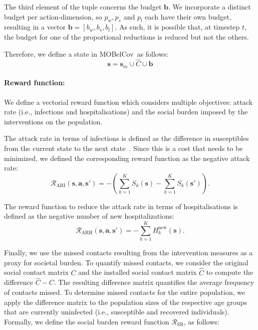 \documentclass{article}
\renewcommand{\cite}[1]{\citep{#1}}
\newcommand{\mdprewardfn}{\mathcal{R}}
\newcommand{\mdpstate}{\mathbf{s}}
\newcommand{\mdpaction}{\mathbf{a}}
\newcommand{\momdpname}{MOBelCov}
\newcommand{\agegroups}{K}
\newcommand{\budget}{\bm{b}}
\begin{document}
The third element of the tuple concerns the budget $\budget$. We incorporate a distinct budget per action-dimension, so $p_{w}, p_{s}$ and $p_{l}$ each have their own budget, resulting in a vector $\budget = [b_w, b_s, b_l]$. As such, it is possible that, at timestep $t$, the budget for one of the proportional reductions is reduced but not the others.

Therefore, we define a state in \momdpname\ as follows:
\begin{equation}
    \mdpstate = \mdpstate_m \cup \hat{C} \cup \budget
\end{equation}

\paragraph{Reward function:} We define a vectorial reward function which considers multiple objectives: attack rate (i.e., infections and hospitalisations) and the social burden imposed by the interventions on the population.

The attack rate in terms of infections is defined as the difference in susceptibles from the current state to the next state~\cite{libin2020}. Since this is a cost that needs to be minimized, we defined the corresponding reward function as the negative attack rate:
\begin{equation}
\mdprewardfn_{\text{ARI}}(\mdpstate,\mdpaction,\mdpstate') = -(\sum_{k=1}^{\agegroups}S_k(\mdpstate)-\sum_{k=1}^{\agegroups}S_k(\mdpstate')).
\end{equation}

The reward function to reduce the attack rate in terms of hospitalisations is defined as the negative number of new hospitalizations:
\begin{equation}
\mdprewardfn_{\text{ARH}}(\mdpstate,\mdpaction,\mdpstate') = -\sum_{k=1}^{\agegroups}H^\text{new}_k(\mdpstate).
\label{eqn:attack-rate-hosp}
\end{equation}

Finally, we use the missed contacts resulting from the intervention measures as a proxy for societal burden. To quantify missed contacts, we consider the original social contact matrix $C$ and the installed social contact matrix $\hat{C}$ to compute the difference $\hat{C} - C$. 
The resulting difference matrix quantifies the average frequency of contacts missed. To determine missed contacts for the entire population, we apply the difference matrix to the population sizes of the respective age groups that are currently uninfected (i.e., susceptible and recovered individuals). Formally, we define the social burden reward function $\mdprewardfn_{\text{SB}}$, as follows:
\end{document}
